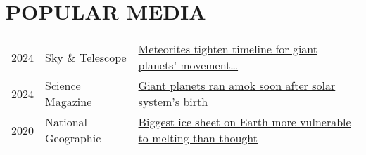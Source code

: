 \section*{POPULAR MEDIA}

\begin{tabular}{l l l} 
2024 & Sky \& Telescope & \href{https://skyandtelescope.org/astronomy-news/meteorites-tighten-timeline-for-giant-planets-movement-through-the-solar-system/}{Meteorites tighten timeline for giant planets' movement\dots}
\\
2024 & Science Magazine & \href{https://www.science.org/content/article/giant-planets-ran-amok-soon-after-solar-system-s-birth}{Giant planets ran amok soon after solar system's birth}
\\
2020 & National Geographic & \href{https://www.nationalgeographic.com/science/article/east-antarctic-ice-sheet-more-vulnerable-to-melting-than-thought}{Biggest ice sheet on Earth more vulnerable to melting than thought}
\end{tabular}